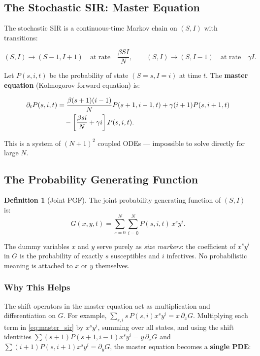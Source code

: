 \documentclass[11pt,a4paper]{article}
\theoremstyle{definition}
\newtheorem{definition}[theorem]{Definition}
\begin{document}
\subsection{The Stochastic SIR: Master Equation}

The stochastic SIR is a continuous-time Markov chain on $(S, I)$ with transitions:

\[
  (S,I) \to (S-1,I+1) \quad\text{at rate}\quad \frac{\beta S I}{N},
  \qquad
  (S,I) \to (S, I-1) \quad\text{at rate}\quad \gamma I.
\]

Let $P(s, i, t)$ be the probability of state $(S=s, I=i)$ at time $t$.
The \textbf{master equation} (Kolmogorov forward equation) is:

\begin{align}
  \partial_t P(s,i,t) &=
    \frac{\beta(s+1)(i-1)}{N} P(s+1,i-1,t)
    + \gamma(i+1) P(s, i+1, t) \notag\\
  &\quad - \left[\frac{\beta si}{N} + \gamma i\right] P(s,i,t).
  \label{eq:master_sir}
\end{align}

This is a system of $(N+1)^2$ coupled ODEs --- impossible to solve directly
for large $N$.

\subsection{The Probability Generating Function}

\begin{definition}[Joint PGF]
The joint probability generating function of $(S, I)$ is:
\begin{equation}
  G(x, y, t) = \sum_{s=0}^{N}\sum_{i=0}^{N} P(s,i,t)\, x^s y^i.
  \label{eq:sir_pgf}
\end{equation}
\end{definition}

The dummy variables $x$ and $y$ serve purely as \emph{size markers}: the coefficient
of $x^s y^i$ in $G$ is the probability of exactly $s$ susceptibles and $i$
infectives. No probabilistic meaning is attached to $x$ or $y$ themselves.

\subsubsection{Why This Helps}

The shift operators in the master equation act as multiplication and differentiation
on $G$. For example, $\sum_{s,i} s\, P(s,i) x^s y^i = x\,\partial_x G$.
Multiplying each term in \eqref{eq:master_sir} by $x^s y^i$,
summing over all states, and using the shift identities
$\sum (s+1)P(s{+}1,i{-}1)x^s y^i = y\,\partial_x G$ and
$\sum (i+1)P(s,i{+}1)x^s y^i = \partial_y G$,
the master equation becomes a \textbf{single PDE}:
\end{document}
